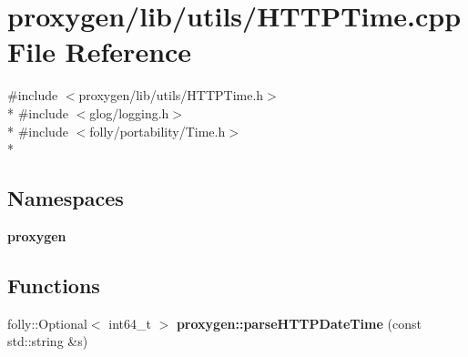 \section{proxygen/lib/utils/\+H\+T\+T\+P\+Time.cpp File Reference}
\label{HTTPTime_8cpp}
{\ttfamily \#include $<$proxygen/lib/utils/\+H\+T\+T\+P\+Time.\+h$>$}\\*
{\ttfamily \#include $<$glog/logging.\+h$>$}\\*
{\ttfamily \#include $<$folly/portability/\+Time.\+h$>$}\\*
\subsection*{Namespaces}
\begin{DoxyCompactItemize}
\item 
 {\bf proxygen}
\end{DoxyCompactItemize}
\subsection*{Functions}
\begin{DoxyCompactItemize}
\item 
folly\+::\+Optional$<$ int64\+\_\+t $>$ {\bf proxygen\+::parse\+H\+T\+T\+P\+Date\+Time} (const std\+::string \&s)
\end{DoxyCompactItemize}
